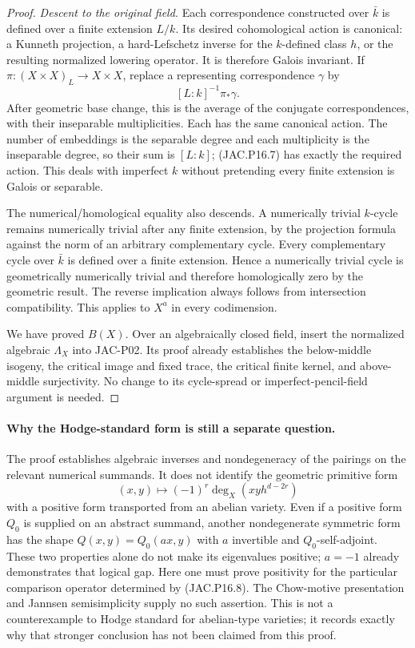 \begin{proof}
\emph{Descent to the original field.}
Each correspondence constructed over $\bar k$ is defined over a
finite extension $L/k$. Its desired cohomological action is
canonical: a Kunneth projection, a hard-Lefschetz inverse for
the $k$-defined class $h$, or the resulting normalized lowering
operator. It is therefore Galois invariant. If
$\pi:(X\times X)_L\to X\times X$, replace a representing
correspondence $\gamma$ by
\[
                         [L:k]^{-1}\pi_*\gamma.          \tag{JAC.P16.7}
\]
After geometric base change, this is the average of the conjugate
correspondences, with their inseparable multiplicities. Each has
the same canonical action. The number of embeddings is the
separable degree and each multiplicity is the inseparable degree,
so their sum is $[L:k]$; (JAC.P16.7) has exactly the required
action. This deals with imperfect $k$ without pretending every
finite extension is Galois or separable.

The numerical/homological equality also descends. A numerically
trivial $k$-cycle remains numerically trivial after any finite
extension, by the projection formula against the norm of an
arbitrary complementary cycle. Every complementary cycle over
$\bar k$ is defined over a finite extension. Hence a numerically
trivial cycle is geometrically numerically trivial and therefore
homologically zero by the geometric result. The reverse implication
always follows from intersection compatibility. This applies
to $X^a$ in every codimension.

We have proved $B(X)$. Over an algebraically closed field, insert
the normalized algebraic $\Lambda_X$ into JAC-P02. Its proof
already establishes the below-middle isogeny, the critical image
and fixed trace, the critical finite kernel, and above-middle
surjectivity. No change to its cycle-spread or imperfect-pencil-field
argument is needed.
\end{proof}

\paragraph{Why the Hodge-standard form is still a separate question.}
The proof establishes algebraic inverses and nondegeneracy of the
pairings on the relevant numerical summands. It does not identify
the geometric primitive form
\[
       (x,y)\longmapsto(-1)^r\deg_X(xyh^{d-2r})           \tag{JAC.P16.8}
\]
with a positive form transported from an abelian variety. Even
if a positive form $Q_0$ is supplied on an abstract summand,
another nondegenerate symmetric form has the shape
$Q(x,y)=Q_0(ax,y)$ with $a$ invertible and $Q_0$-self-adjoint.
These two properties alone do not make its eigenvalues positive;
$a=-1$ already demonstrates that logical gap. Here one must prove
positivity for the particular comparison operator determined by
(JAC.P16.8). The Chow-motive presentation and Jannsen
semisimplicity supply no such assertion. This is not a
counterexample to Hodge standard for abelian-type varieties;
it records exactly why that stronger conclusion has not been
claimed from this proof.

